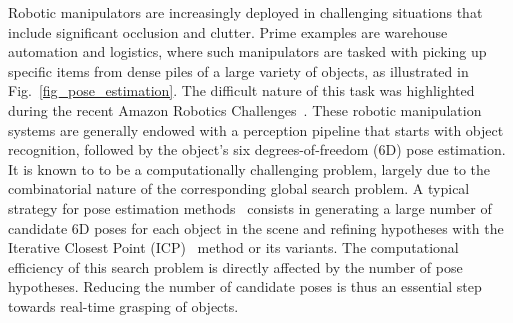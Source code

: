 \documentclass[letterpaper, 10 pt, conference]{ieeeconf}  %
\begin{document}
Robotic manipulators are increasingly deployed in challenging  situations that include significant occlusion and clutter. Prime examples are warehouse automation and logistics, where such manipulators are tasked with picking up specific items from dense piles of a large variety of objects, as illustrated in Fig.~\ref{fig_pose_estimation}. The difficult nature of this task was highlighted during the recent Amazon Robotics Challenges~\cite{Correll:2016aa}. These robotic manipulation systems are generally endowed with a perception pipeline that starts with object recognition, followed by the object's six degrees-of-freedom (6D) pose estimation. It is known to to be a computationally challenging problem, largely due to the combinatorial nature of the corresponding global search problem. A typical strategy for pose estimation methods~\cite{hinterstoisser2016going,krull2015learning,brachmann2014learning,michel2017global} consists in generating a large number of candidate 6D poses for each object in the scene and refining hypotheses with the Iterative Closest Point (ICP)~\cite{besl1992method} method or its variants. The computational efficiency of this search problem is directly affected by the number of pose hypotheses. Reducing the number of candidate poses is thus an essential step towards real-time grasping of objects.
\end{document}
